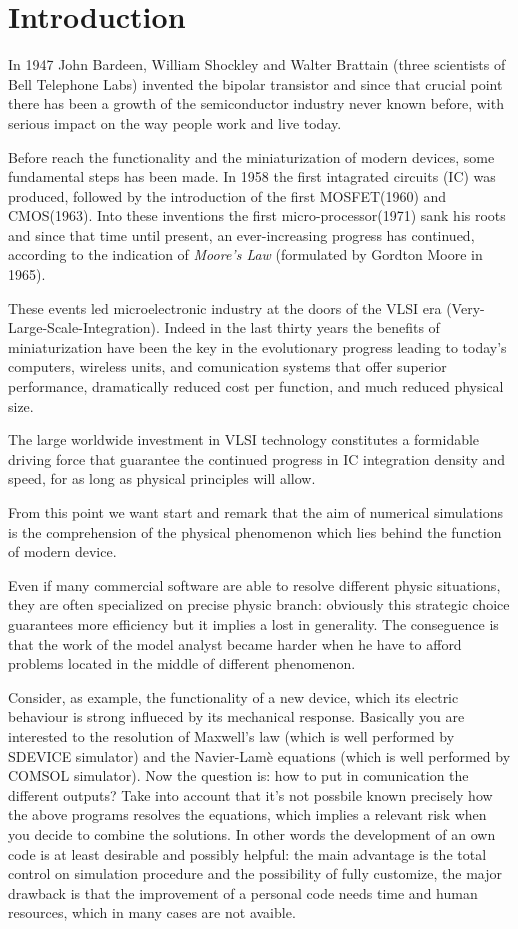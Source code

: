 \chapter{Introduction}

In 1947 John Bardeen, William Shockley and Walter Brattain (three scientists of Bell Telephone Labs) invented the bipolar transistor and since that crucial point there has been a growth  of the semiconductor industry never known before, with serious impact on the way people work and live today. 

Before reach the functionality and the miniaturization of modern devices, some fundamental steps has been made.
In 1958 the first intagrated circuits (IC) was produced, followed by the introduction of the first MOSFET(1960) and CMOS(1963). Into these inventions the first micro-processor(1971) sank his roots  and since that time until present, an ever-increasing progress has continued, according to the indication of \textit{Moore's Law} (formulated by Gordton Moore in 1965).

These events led microelectronic industry at the doors of the VLSI era (Very-Large-Scale-Integration). Indeed in the last thirty years the benefits of miniaturization have been the key in the evolutionary progress leading to today's computers, wireless units, and comunication systems that offer superior performance, dramatically reduced cost per function, and much reduced physical size.

The large worldwide investment in VLSI technology constitutes a formidable driving force that guarantee the continued progress in IC integration density and speed, for as long as physical principles will allow.

From this point we want start and remark that the aim of numerical simulations is the comprehension of the physical phenomenon which lies behind the function of modern device. 

Even if many commercial software are able to resolve different physic situations, they are often specialized on precise physic branch: obviously this strategic choice guarantees more efficiency but it implies a lost in generality. The conseguence is that the work of the model analyst became harder when he have to afford problems located in the middle of different phenomenon. 

Consider, as example, the functionality of a new device, which its electric behaviour is strong influeced by its mechanical response. Basically you are interested to the resolution of Maxwell's law  (which is well performed by SDEVICE simulator) and the Navier-Lam\`e equations (which is well performed by COMSOL simulator). Now the question is: how to put in comunication the different outputs?
Take into account that it's not possbile known precisely how the above programs resolves the equations, which implies a relevant risk when you decide to combine the solutions. 
In other words the development of an own code is at least desirable and possibly helpful: the main advantage is the total control on simulation procedure and the possibility of fully customize, the major drawback is that the improvement of a personal code needs time and human resources, which in many cases are not avaible.   


